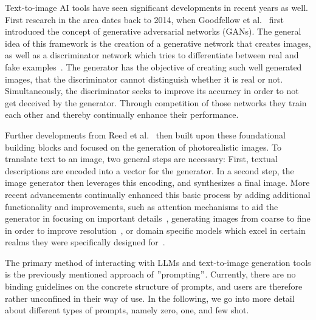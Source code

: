 Text-to-image AI tools have seen significant developments in recent years as well.
First research in the area dates back to 2014, when Goodfellow et al\(.\)~\cite{goodfellow_generative_2014,goodfellow_generative_2020}
first introduced the concept of generative adversarial networks (GANs).
The general idea of this framework is the creation of a generative network that creates
images, as well as a discriminator network which tries to differentiate between real and fake
examples~\cite{creswell_generative_2018}.
The generator has the objective of creating such well generated images, that the discriminator
cannot distinguish whether it is real or not.
Simultaneously, the discriminator seeks to improve its accuracy in order to not get deceived by
the generator.
Through competition of those networks they train each other and thereby continually enhance their
performance.

Further developments from Reed et al\(.\)~\cite{reed_generative_2016} then built upon these foundational
building blocks and focused on the generation of photorealistic images.
To translate text to an image, two general steps are necessary:
First, textual descriptions are encoded into a vector for the generator.
In a second step, the image generator then leverages this encoding, and synthesizes a final image.
More recent advancements continually enhanced this basic process by adding additional
functionality and improvements, such as attention mechanisms to aid the generator in focusing on
important details~\cite{xu_attngan_2018}, generating images from coarse to fine in order to improve resolution~\cite{karras_progressive_2018},
or domain specific models which excel in certain realms they were specifically designed for~\cite{zhu_be_2017}.
\newline

The primary method of interacting with LLMs and text-to-image generation tools is the previously
mentioned approach of \("\)prompting\("\).
Currently, there are no binding guidelines on the concrete structure of prompts,
and users are therefore rather unconfined in their way of use.
In the following, we go into more detail about different types of prompts, namely zero, one, and
few shot.


